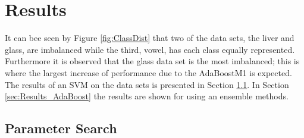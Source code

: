 \section{Results}
\label{sec:Results}

It can bee seen by Figure \ref{fig:ClassDist} that two of the data sets, the  liver and glass, are imbalanced while the third, vowel, has each class equally represented.
Furthermore it is observed that the glass data set is the most imbalanced; this is where the largest increase of performance due to the AdaBoostM1 is expected.
The results of an SVM on the data sets is presented in Section \ref{sec:Results_ParamSearch}.
In Section \ref{sec:Results_AdaBoost} the results are shown for using an ensemble methods.

\subsection{Parameter Search}
\label{sec:Results_ParamSearch}

